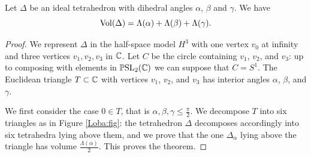 \begin{teo} Let $\Delta$ be an ideal tetrahedron with dihedral angles $\alpha$, $\beta$ and $\gamma$. We have
$${\rm Vol}(\Delta) = \Lambda(\alpha) + \Lambda(\beta) + \Lambda(\gamma).$$
\end{teo}
\begin{proof}
We represent $\Delta$ in the half-space model $H^3$ with one vertex $v_0$ at infinity and three vertices $v_1,v_2,v_3$ in $\mathbb{C}$. Let $C$ be the circle containing $v_1$, $v_2$, and $v_3$: up to composing with elements in $\mathbb{P}{\rm SL}_2(\mathbb{C})$ we can suppose that $C=S^1$. The Euclidean triangle $T\subset\mathbb{C}$ with vertices $v_1$, $v_2$, and $v_3$ has interior angles $\alpha$, $\beta$, and $\gamma$. 

We first consider the case $0\in T$, that is $\alpha, \beta, \gamma \leqslant \frac \pi 2$. 
We decompose $T$ into six triangles as in Figure \ref{Loba:fig}: the tetrahedron $\Delta$ decomposes accordingly into six tetrahedra lying above them, and we prove that the one $\Delta_\alpha$ lying above the \iftoggle{BW}{light grey}{yellow} triangle has volume $\frac{\Lambda(\alpha)}2$. 
This proves the theorem.


\end{proof}
